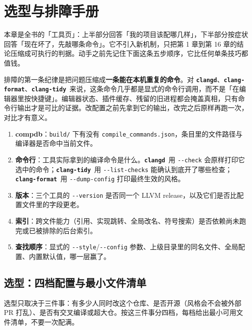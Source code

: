 \documentclass[12pt,a4paper,fontset=fandol]{ctexbook}
\newcommand{\Opt}[1]{\texttt{-\/-#1}}
\newcommand{\Bk}{\discretionary{}{}{}}
\newcommand{\Lib}[1]{\textbf{\texttt{#1}}}
\newcommand{\Tidy}{\Lib{clang-tidy}}
\newcommand{\Fmt}{\Lib{clang-format}}
\newcommand{\CD}{\Lib{clangd}}
\begin{document}
\chapter{选型与排障手册}\label{ch:ch17}

本章是全书的「工具页」：上半部分回答「我的项目该配哪几样」，下半部分按症状回答「现在坏了，先敲哪条命令」。它不引入新机制，只把第 1 章到第 16 章的结论压缩成可执行的判据。动手之前先记住下面这条五步顺序，它比任何单条技巧都值钱。

\begin{note}[title={先复现，再改配置}]
排障的第一条纪律是把问题压缩成\textbf{一条能在本机重复的命令}。对 \CD、\Fmt、\Tidy\ 来说，这条命令几乎都是显式的命令行调用，而不是「在编辑器里按快捷键」。编辑器状态、插件缓存、残留的旧进程都会掩盖真相，只有命令行输出才是可比的证据。改配置之前先拿到它的输出，改完之后原样再跑一次，对比才有意义。
\end{note}

\begin{guideline}[title={五步排障顺序}]
\begin{enumerate}
  \item \textbf{compdb}：\texttt{build/} 下有没有 \texttt{compile\_\allowbreak commands.json}，条目里的文件路径与编译器是否命中当前文件。
  \item \textbf{命令行}：工具实际拿到的编译命令是什么。\CD\ 用 \Opt{check} 会原样打印它选中的命令；\Tidy\ 用 \Opt{list-checks} 能确认到底开了哪些检查；\Fmt\ 用 \Opt{dump-config} 打印最终生效的风格。
  \item \textbf{版本}：三个工具的 \Opt{version} 是否同一个 LLVM release，以及它们是否比配置文件里的字段更老。
  \item \textbf{索引}：跨文件能力（引用、实现跳转、全局改名、符号搜索）是否依赖尚未跑完或已被排除的后台索引。
  \item \textbf{查找顺序}：显式的 \Opt{style}/{\Bk}\Opt{config} 参数、上级目录里的同名文件、全局配置、内置默认值，哪一层赢了。
\end{enumerate}
\end{guideline}

\section{选型：四档配置与最小文件清单}\label{sec:ch17-s1}

选型只取决于三件事：有多少人同时改这个仓库、是否开源（风格会不会被外部 PR 打乱）、是否有交叉编译或超大仓。按这三件事分四档，每档给出最小可用文件清单，不要一次配满。
\end{document}
